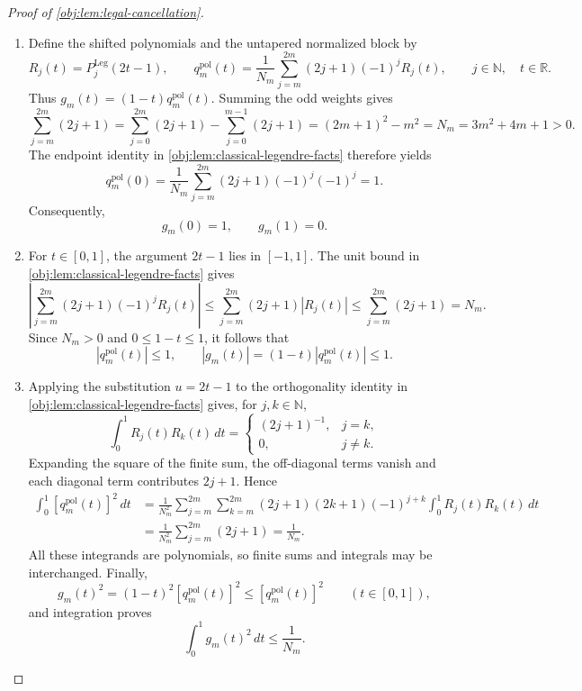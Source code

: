 \documentclass[11pt]{article}
\begin{document}
\begin{proof}[Proof of \cref{obj:lem:legal-cancellation}]
\begin{enumerate}
\item Define the shifted polynomials and the untapered normalized block by
\[
R_j(t)=P_j^{\mathrm{Leg}}(2t-1),
\qquad
q_m^{\mathrm{pol}}(t)
=\frac1{N_m}\sum_{j=m}^{2m}(2j+1)(-1)^jR_j(t),
\qquad j\in\mathbb N,\quad t\in\mathbb R.
\]
Thus \(g_m(t)=(1-t)q_m^{\mathrm{pol}}(t)\). Summing the odd weights gives
\[
\sum_{j=m}^{2m}(2j+1)
=\sum_{j=0}^{2m}(2j+1)-\sum_{j=0}^{m-1}(2j+1)
=(2m+1)^2-m^2
=N_m=3m^2+4m+1>0.
\]
The endpoint identity in \cref{obj:lem:classical-legendre-facts} therefore yields
\[
q_m^{\mathrm{pol}}(0)
=\frac1{N_m}\sum_{j=m}^{2m}(2j+1)(-1)^j(-1)^j
=1.
\]
Consequently,
\[
g_m(0)=1,\qquad g_m(1)=0.
\]

\item For \(t\in[0,1]\), the argument \(2t-1\) lies in \([-1,1]\). The unit bound in \cref{obj:lem:classical-legendre-facts} gives
\[
\left|\sum_{j=m}^{2m}(2j+1)(-1)^jR_j(t)\right|
\le\sum_{j=m}^{2m}(2j+1)|R_j(t)|
\le\sum_{j=m}^{2m}(2j+1)=N_m.
\]
Since \(N_m>0\) and \(0\le1-t\le1\), it follows that
\[
|q_m^{\mathrm{pol}}(t)|\le1,
\qquad
|g_m(t)|=(1-t)|q_m^{\mathrm{pol}}(t)|\le1.
\]

\item Applying the substitution \(u=2t-1\) to the orthogonality identity in \cref{obj:lem:classical-legendre-facts} gives, for \(j,k\in\mathbb N\),
\[
\int_0^1R_j(t)R_k(t)\,dt
=
\begin{cases}
(2j+1)^{-1},&j=k,\\
0,&j\ne k.
\end{cases}
\]
Expanding the square of the finite sum, the off-diagonal terms vanish and each diagonal term contributes \(2j+1\). Hence
\[
\begin{aligned}
\int_0^1[q_m^{\mathrm{pol}}(t)]^2\,dt
&=\frac1{N_m^2}
\sum_{j=m}^{2m}\sum_{k=m}^{2m}
(2j+1)(2k+1)(-1)^{j+k}
\int_0^1R_j(t)R_k(t)\,dt\\
&=\frac1{N_m^2}\sum_{j=m}^{2m}(2j+1)
=\frac1{N_m}.
\end{aligned}
\]
All these integrands are polynomials, so finite sums and integrals may be interchanged. Finally,
\[
g_m(t)^2=(1-t)^2[q_m^{\mathrm{pol}}(t)]^2
\le[q_m^{\mathrm{pol}}(t)]^2
\qquad(t\in[0,1]),
\]
and integration proves
\[
\int_0^1g_m(t)^2\,dt\le\frac1{N_m}.
\]


\end{enumerate}
\end{proof}
\end{document}
